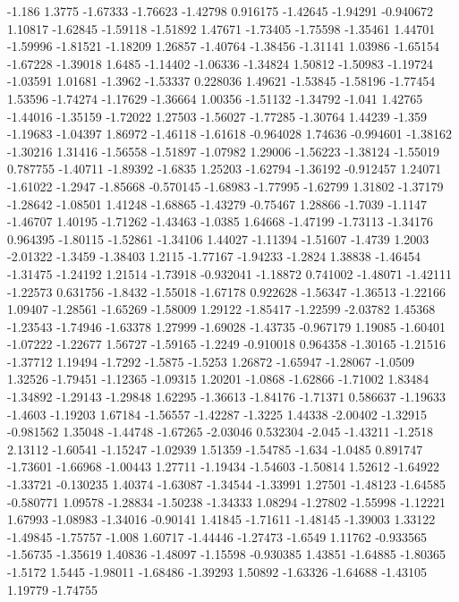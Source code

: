 \documentclass[9pt]{article}
\theoremstyle{plain}
\theoremstyle{definition}
\theoremstyle{remark}
\numberwithin{equation}{section}
\begin{document}
-1.186
1.3775
-1.67333
-1.76623
-1.42798
0.916175
-1.42645
-1.94291
-0.940672
1.10817
-1.62845
-1.59118
-1.51892
1.47671
-1.73405
-1.75598
-1.35461
1.44701
-1.59996
-1.81521
-1.18209
1.26857
-1.40764
-1.38456
-1.31141
1.03986
-1.65154
-1.67228
-1.39018
1.6485
-1.14402
-1.06336
-1.34824
1.50812
-1.50983
-1.19724
-1.03591
1.01681
-1.3962
-1.53337
0.228036
1.49621
-1.53845
-1.58196
-1.77454
1.53596
-1.74274
-1.17629
-1.36664
1.00356
-1.51132
-1.34792
-1.041
1.42765
-1.44016
-1.35159
-1.72022
1.27503
-1.56027
-1.77285
-1.30764
1.44239
-1.359
-1.19683
-1.04397
1.86972
-1.46118
-1.61618
-0.964028
1.74636
-0.994601
-1.38162
-1.30216
1.31416
-1.56558
-1.51897
-1.07982
1.29006
-1.56223
-1.38124
-1.55019
0.787755
-1.40711
-1.89392
-1.6835
1.25203
-1.62794
-1.36192
-0.912457
1.24071
-1.61022
-1.2947
-1.85668
-0.570145
-1.68983
-1.77995
-1.62799
1.31802
-1.37179
-1.28642
-1.08501
1.41248
-1.68865
-1.43279
-0.75467
1.28866
-1.7039
-1.1147
-1.46707
1.40195
-1.71262
-1.43463
-1.0385
1.64668
-1.47199
-1.73113
-1.34176
0.964395
-1.80115
-1.52861
-1.34106
1.44027
-1.11394
-1.51607
-1.4739
1.2003
-2.01322
-1.3459
-1.38403
1.2115
-1.77167
-1.94233
-1.2824
1.38838
-1.46454
-1.31475
-1.24192
1.21514
-1.73918
-0.932041
-1.18872
0.741002
-1.48071
-1.42111
-1.22573
0.631756
-1.8432
-1.55018
-1.67178
0.922628
-1.56347
-1.36513
-1.22166
1.09407
-1.28561
-1.65269
-1.58009
1.29122
-1.85417
-1.22599
-2.03782
1.45368
-1.23543
-1.74946
-1.63378
1.27999
-1.69028
-1.43735
-0.967179
1.19085
-1.60401
-1.07222
-1.22677
1.56727
-1.59165
-1.2249
-0.910018
0.964358
-1.30165
-1.21516
-1.37712
1.19494
-1.7292
-1.5875
-1.5253
1.26872
-1.65947
-1.28067
-1.0509
1.32526
-1.79451
-1.12365
-1.09315
1.20201
-1.0868
-1.62866
-1.71002
1.83484
-1.34892
-1.29143
-1.29848
1.62295
-1.36613
-1.84176
-1.71371
0.586637
-1.19633
-1.4603
-1.19203
1.67184
-1.56557
-1.42287
-1.3225
1.44338
-2.00402
-1.32915
-0.981562
1.35048
-1.44748
-1.67265
-2.03046
0.532304
-2.045
-1.43211
-1.2518
2.13112
-1.60541
-1.15247
-1.02939
1.51359
-1.54785
-1.634
-1.0485
0.891747
-1.73601
-1.66968
-1.00443
1.27711
-1.19434
-1.54603
-1.50814
1.52612
-1.64922
-1.33721
-0.130235
1.40374
-1.63087
-1.34544
-1.33991
1.27501
-1.48123
-1.64585
-0.580771
1.09578
-1.28834
-1.50238
-1.34333
1.08294
-1.27802
-1.55998
-1.12221
1.67993
-1.08983
-1.34016
-0.90141
1.41845
-1.71611
-1.48145
-1.39003
1.33122
-1.49845
-1.75757
-1.008
1.60717
-1.44446
-1.27473
-1.6549
1.11762
-0.933565
-1.56735
-1.35619
1.40836
-1.48097
-1.15598
-0.930385
1.43851
-1.64885
-1.80365
-1.5172
1.5445
-1.98011
-1.68486
-1.39293
1.50892
-1.63326
-1.64688
-1.43105
1.19779
-1.74755
\end{document}
